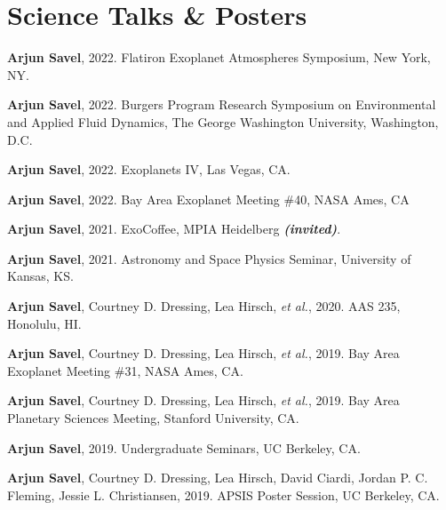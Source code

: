 \documentclass[letterpaper,12pt]{article}
\newcommand{\resumeSubHeadingListStart}{\begin{itemize}[leftmargin=*]}
\newcommand{\shorterSection}[1]{\vspace{-10pt}\section{#1}}
\begin{document}
\shorterSection{Science Talks \& Posters}
\small
  \begin{list}{}{\cvlist}

\item[{\color{numcolor}\scriptsize11}] \textbf{Arjun Savel}, 2022. Flatiron Exoplanet Atmospheres Symposium, New York, NY.

\item[{\color{numcolor}\scriptsize10}] \textbf{Arjun Savel}, 2022. Burgers Program Research Symposium on Environmental and Applied Fluid Dynamics, The George Washington University, Washington, D.C.

\item[{\color{numcolor}\scriptsize9}] \textbf{Arjun Savel}, 2022. Exoplanets IV, Las Vegas, CA.


\item[{\color{numcolor}\scriptsize8}] \textbf{Arjun Savel}, 2022. Bay Area Exoplanet Meeting \#40, NASA Ames, CA
  
 \item[{\color{numcolor}\scriptsize7}] \textbf{Arjun Savel}, 2021. ExoCoffee, MPIA Heidelberg \textbf{\textit{(invited)}}.
  
\item[{\color{numcolor}\scriptsize6}] \textbf{Arjun Savel}, 2021. Astronomy and Space Physics Seminar, University of Kansas, KS.

\item[{\color{numcolor}\scriptsize5}] \textbf{Arjun Savel}, Courtney D. Dressing, Lea Hirsch, \emph{et al.}, 2020. AAS 235, Honolulu, HI.

\item[{\color{numcolor}\scriptsize4}] \textbf{Arjun Savel}, Courtney D. Dressing, Lea Hirsch, \emph{et al.}, 2019. Bay Area Exoplanet Meeting \#31, NASA Ames, CA.

\item[{\color{numcolor}\scriptsize3}] \textbf{Arjun Savel}, Courtney D. Dressing, Lea Hirsch, \emph{et al.}, 2019. Bay Area Planetary Sciences Meeting, Stanford University, CA.

\item[{\color{numcolor}\scriptsize2}] \textbf{Arjun Savel}, 2019. Undergraduate Seminars, UC Berkeley, CA.

\item[{\color{numcolor}\scriptsize1}] \textbf{Arjun Savel}, Courtney D. Dressing, Lea Hirsch, David Ciardi, Jordan P. C. Fleming, Jessie L. Christiansen, 2019. APSIS Poster Session, UC Berkeley, CA.

\end{list}
\end{document}
